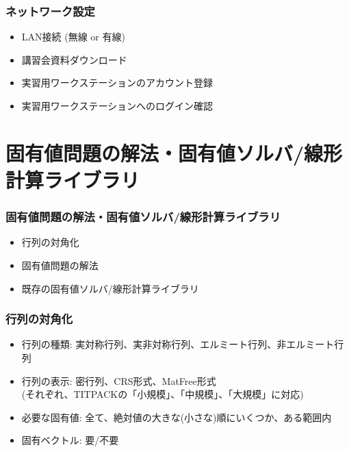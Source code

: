 \begin{frame}
  \frametitle{ネットワーク設定}
  \begin{itemize}
    \setlength{\itemsep}{1em}
  \item LAN接続 (無線 or 有線)
  \item 講習会資料ダウンロード
  \item 実習用ワークステーションのアカウント登録
  \item 実習用ワークステーションへのログイン確認
  \end{itemize}
\end{frame}

\section{固有値問題の解法・固有値ソルバ/線形計算ライブラリ}

\begin{frame}
  \frametitle{固有値問題の解法・固有値ソルバ/線形計算ライブラリ}
  \begin{itemize}
  \item 行列の対角化
  \item 固有値問題の解法
  \item 既存の固有値ソルバ/線形計算ライブラリ
  \end{itemize}
\end{frame}

\begin{frame}
  \frametitle{行列の対角化}
  \begin{itemize}
    \setlength{\itemsep}{1em}
  \item 行列の種類: 実対称行列、実非対称行列、エルミート行列、非エルミート行列
  \item 行列の表示: 密行列、CRS形式、MatFree形式 \\
    (それぞれ、TITPACKの「小規模」、「中規模」、「大規模」に対応)
  \item 必要な固有値: 全て、絶対値の大きな(小さな)順にいくつか、ある範囲内
  \item 固有ベクトル: 要/不要
  \end{itemize}
\end{frame}

